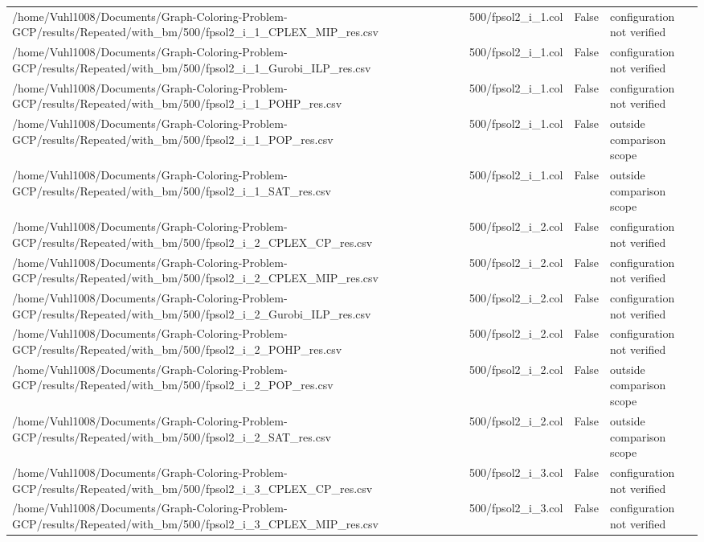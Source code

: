 \begin{table}[htbp]
\begin{tabular}{llll}
/home/Vuhl1008/Documents/Graph-Coloring-Problem-GCP/results/Repeated/with\_bm/500/fpsol2\_i\_1\_CPLEX\_MIP\_res.csv & 500/fpsol2\_i\_1.col & False & configuration not verified \\
/home/Vuhl1008/Documents/Graph-Coloring-Problem-GCP/results/Repeated/with\_bm/500/fpsol2\_i\_1\_Gurobi\_ILP\_res.csv & 500/fpsol2\_i\_1.col & False & configuration not verified \\
/home/Vuhl1008/Documents/Graph-Coloring-Problem-GCP/results/Repeated/with\_bm/500/fpsol2\_i\_1\_POHP\_res.csv & 500/fpsol2\_i\_1.col & False & configuration not verified \\
/home/Vuhl1008/Documents/Graph-Coloring-Problem-GCP/results/Repeated/with\_bm/500/fpsol2\_i\_1\_POP\_res.csv & 500/fpsol2\_i\_1.col & False & outside comparison scope \\
/home/Vuhl1008/Documents/Graph-Coloring-Problem-GCP/results/Repeated/with\_bm/500/fpsol2\_i\_1\_SAT\_res.csv & 500/fpsol2\_i\_1.col & False & outside comparison scope \\
/home/Vuhl1008/Documents/Graph-Coloring-Problem-GCP/results/Repeated/with\_bm/500/fpsol2\_i\_2\_CPLEX\_CP\_res.csv & 500/fpsol2\_i\_2.col & False & configuration not verified \\
/home/Vuhl1008/Documents/Graph-Coloring-Problem-GCP/results/Repeated/with\_bm/500/fpsol2\_i\_2\_CPLEX\_MIP\_res.csv & 500/fpsol2\_i\_2.col & False & configuration not verified \\
/home/Vuhl1008/Documents/Graph-Coloring-Problem-GCP/results/Repeated/with\_bm/500/fpsol2\_i\_2\_Gurobi\_ILP\_res.csv & 500/fpsol2\_i\_2.col & False & configuration not verified \\
/home/Vuhl1008/Documents/Graph-Coloring-Problem-GCP/results/Repeated/with\_bm/500/fpsol2\_i\_2\_POHP\_res.csv & 500/fpsol2\_i\_2.col & False & configuration not verified \\
/home/Vuhl1008/Documents/Graph-Coloring-Problem-GCP/results/Repeated/with\_bm/500/fpsol2\_i\_2\_POP\_res.csv & 500/fpsol2\_i\_2.col & False & outside comparison scope \\
/home/Vuhl1008/Documents/Graph-Coloring-Problem-GCP/results/Repeated/with\_bm/500/fpsol2\_i\_2\_SAT\_res.csv & 500/fpsol2\_i\_2.col & False & outside comparison scope \\
/home/Vuhl1008/Documents/Graph-Coloring-Problem-GCP/results/Repeated/with\_bm/500/fpsol2\_i\_3\_CPLEX\_CP\_res.csv & 500/fpsol2\_i\_3.col & False & configuration not verified \\
/home/Vuhl1008/Documents/Graph-Coloring-Problem-GCP/results/Repeated/with\_bm/500/fpsol2\_i\_3\_CPLEX\_MIP\_res.csv & 500/fpsol2\_i\_3.col & False & configuration not verified \\

\end{tabular}
\end{table}
